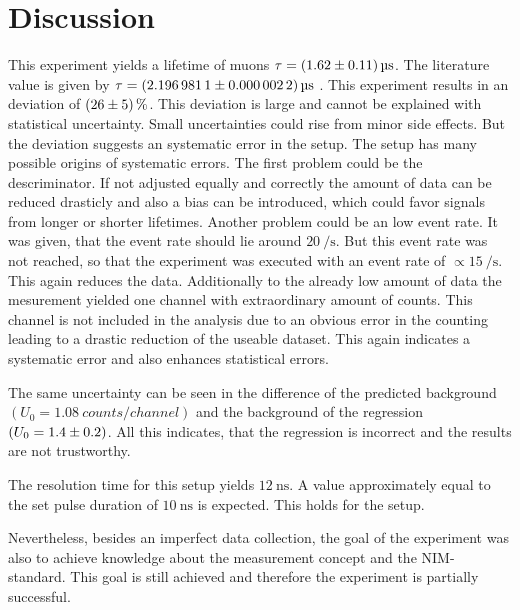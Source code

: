 \chapter{Discussion}
\label{cha:Diskussion}
This experiment yields a lifetime of muons $\tau = \qty{1.62 +- 0.11}{\micro\second}$. The literature value is given by 
$\tau = \qty{2.1969811 +- 0.0000022}{\micro\second}$ \cite{PDG}. This experiment results in an deviation of $\qty{26 +- 5}{\percent}$. This deviation is large and cannot be explained 
with statistical uncertainty. Small uncertainties could rise from minor side effects. But the 
deviation suggests an systematic error in the setup. The setup has many possible origins of systematic errors. The first problem could be the descriminator. If not adjusted equally 
and correctly the amount of data can be reduced drasticly and also a bias can be introduced, which could favor signals from longer or shorter lifetimes. Another problem could be an 
low event rate. It was given, that the event rate should lie around $\qty{20}{\per\second}$. But this event rate was not reached, so that the experiment was executed with an event rate 
of $\propto \qty{15}{\per\second}$. This again reduces the data. Additionally to the already low amount of data the mesurement yielded one channel with extraordinary amount of 
counts. This channel is not included in the analysis due to an obvious error in the counting leading to a drastic reduction of the useable dataset. This again indicates a systematic error
and also enhances statistical errors. 

The same uncertainty can be seen in the difference of the predicted background $(U_0 = \qty{1.08}{counts\per channel})$ and the background of the regression $(U_0 = \num{1.4 +- 0.2})$.
All this indicates, that the regression is incorrect and the results are not trustworthy. 

The resolution time for this setup yields $\qty{12}{\nano\second}$. A value approximately equal to the set pulse duration of $\qty{10}{\nano\second}$ is expected. This holds for 
the setup.

Nevertheless, besides an imperfect data collection, the goal of the experiment was also to achieve knowledge about the measurement concept and the NIM-standard. This goal is still 
achieved and therefore the experiment is partially  successful.
